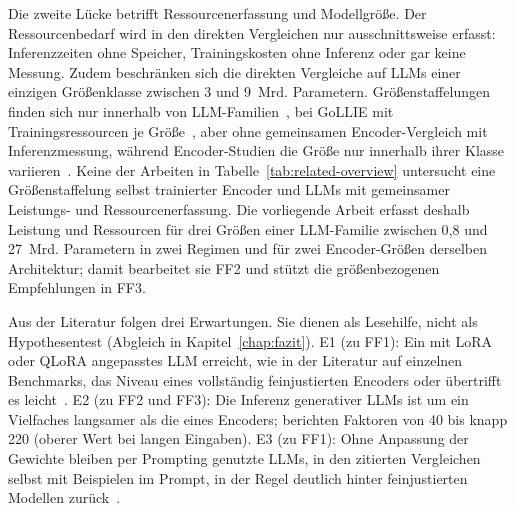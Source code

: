 Die zweite Lücke betrifft Ressourcenerfassung und Modellgröße.
Der Ressourcenbedarf wird in den direkten Vergleichen nur
ausschnittsweise erfasst: Inferenzzeiten ohne Speicher, Trainingskosten
ohne Inferenz oder gar keine Messung.
Zudem beschränken sich die direkten Vergleiche auf LLMs einer einzigen
Größenklasse zwischen 3 und 9~Mrd. Parametern.
Größenstaffelungen finden sich nur innerhalb von
LLM-Familien~\cite{zhou2024universalner,sainz2024gollie}, bei
GoLLIE mit Trainingsressourcen je
Größe~\cite[Anh.~D.3, Tab.~10]{sainz2024gollie}, aber ohne gemeinsamen
Encoder-Vergleich mit Inferenzmessung, während
Encoder-Studien die Größe nur innerhalb ihrer Klasse
variieren~\cite{keraghel2024recent}.
Keine der Arbeiten in Tabelle~\ref{tab:related-overview} untersucht eine
Größenstaffelung selbst trainierter Encoder und LLMs mit gemeinsamer
Leistungs- und Ressourcenerfassung.
Die vorliegende Arbeit erfasst deshalb Leistung und Ressourcen für drei
Größen einer LLM-Familie zwischen 0{,}8 und 27~Mrd. Parametern in zwei
Regimen und für zwei Encoder-Größen derselben Architektur; damit
bearbeitet sie FF2 und stützt die größenbezogenen Empfehlungen in FF3.


Aus der Literatur folgen drei Erwartungen.
Sie dienen als Lesehilfe, nicht als Hypothesentest (Abgleich in
Kapitel~\ref{chap:fazit}).
E1 (zu FF1): Ein mit LoRA oder QLoRA angepasstes LLM erreicht, wie in
der Literatur auf einzelnen Benchmarks, das Niveau eines vollständig
feinjustierten Encoders oder übertrifft es
leicht~\cite{zhan2026generativeNER,obeidat2025llm}.
E2 (zu FF2 und FF3): Die Inferenz generativer LLMs ist um ein Vielfaches
langsamer als die eines Encoders;
\textcite[Abschn.~III--IV]{obeidat2025llm} berichten Faktoren von 40 bis
knapp 220 (oberer Wert bei langen Eingaben).
E3 (zu FF1): Ohne Anpassung der Gewichte bleiben per Prompting genutzte
LLMs, in den zitierten Vergleichen selbst mit Beispielen im Prompt,
in der Regel deutlich hinter feinjustierten Modellen
zurück~\cite{keraghel2024recent,tan2023damo}.
